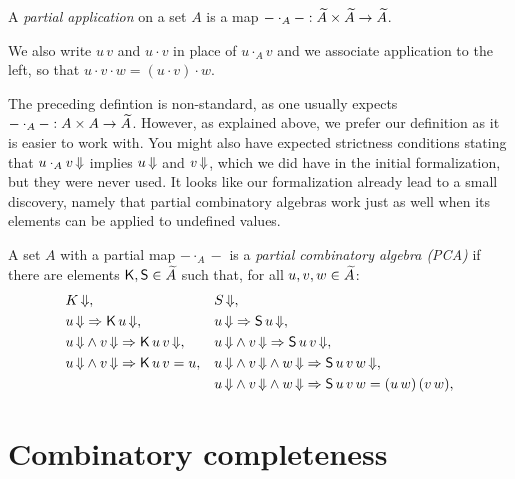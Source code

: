 \begin{definition}
  \label{def:partial-application}
  \leanok
  A \emph{partial application} on a set $A$ is a map ${-} \cdot_A {-} : \widetilde{A} \times \widetilde{A} \to \widetilde{A}$.
\end{definition}

We also write $u \, v$ and $u \cdot v$ in place of $u \cdot_A v$ and we associate application to the left, so that $u \cdot v \cdot w = (u \cdot v) \cdot w$.

The preceding defintion is non-standard, as one usually expects ${-} \cdot_A {-} : A \times A \to \widetilde{A}$.
However, as explained above, we prefer our definition as it is easier to work with. You might also have expected
strictness conditions stating that $u \cdot_A v\,{\Downarrow}$ implies $u\,{\Downarrow}$ and $v\,{\Downarrow}$, which we did have in the initial formalization, but they were never used. It looks like our formalization already lead to a small discovery, namely that partial combinatory algebras work just as well when its elements can be applied to undefined values.

\begin{definition}
  \label{def:PCA}
  \leanok
  A set $A$ with a partial map ${-} \cdot_A {-}$ is a \emph{partial combinatory algebra (PCA)} if there are
  elements $\mathsf{K}, \mathsf{S} \in \widetilde{A}$ such that, for all $u, v, w \in \widetilde{A}$:
  \begin{align*}
    &K\,{\Downarrow}, &
    &S\,{\Downarrow},\\
    &u\,{\Downarrow} \Rightarrow \mathsf{K} \, u\,{\Downarrow}, &
    &u\,{\Downarrow} \Rightarrow \mathsf{S} \, u\,{\Downarrow}, \\
    &u\,{\Downarrow} \land v\,{\Downarrow} \Rightarrow \mathsf{K} \, u \, v\,{\Downarrow}, &
    &u\,{\Downarrow} \land v\,{\Downarrow} \Rightarrow \mathsf{S} \, u \, v\,{\Downarrow}, \\
    &u\,{\Downarrow} \land v\,{\Downarrow} \Rightarrow \mathsf{K} \, u \, v = u, &
    &u\,{\Downarrow} \land v\,{\Downarrow} \land w\,{\Downarrow} \Rightarrow \mathsf{S} \, u \, v \, w\,{\Downarrow}, \\
    &&
    &u\,{\Downarrow} \land v\,{\Downarrow} \land w\,{\Downarrow}
     \Rightarrow \mathsf{S} \, u \, v \, w = (u \, w) \, (v \, w), \\
  \end{align*}
\end{definition}


\section{Combinatory completeness}


